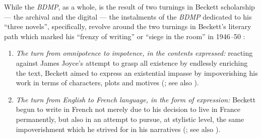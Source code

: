 \begin{paper}
While the \emph{BDMP}, as a whole, is the result of two turnings in
Beckett scholarship --- the archival and the digital --- the instalments
of the \emph{BDMP} dedicated to his ``three novels'', specifically,
revolve around the two turnings in Beckett's literary path which marked
his ``frenzy of writing'' or ``siege in the room'' in 1946\emph{--}50 \citep[qtd. in][309]{oreilly_making_2017}:

\begin{enumerate}
\def\labelenumi{\arabic{enumi}.}
\item
  \emph{The turn from omnipotence to impotence, in the contents
  expressed:} reacting against James Joyce's attempt to grasp all
  existence by endlessly enriching the text, Beckett aimed to express an
  existential impasse by impoverishing his work in terms of characters,
  plots and motives (\citealt[351--53]{knowlson_damned_1996}; see also \citealt[25]{oreilly_making_2017}).
\item
  \emph{The turn from English to French language, in the form of
  expression:} Beckett begun to write in French not merely due to his
  decision to live in France permanently, but also in an attempt to
  pursue, at stylistic level, the same impoverishment which he strived for
  in his narratives (\citealt[356--58]{knowlson_damned_1996}; see also \citealt[25]{oreilly_making_2017}).
\end{enumerate}


\end{paper}

